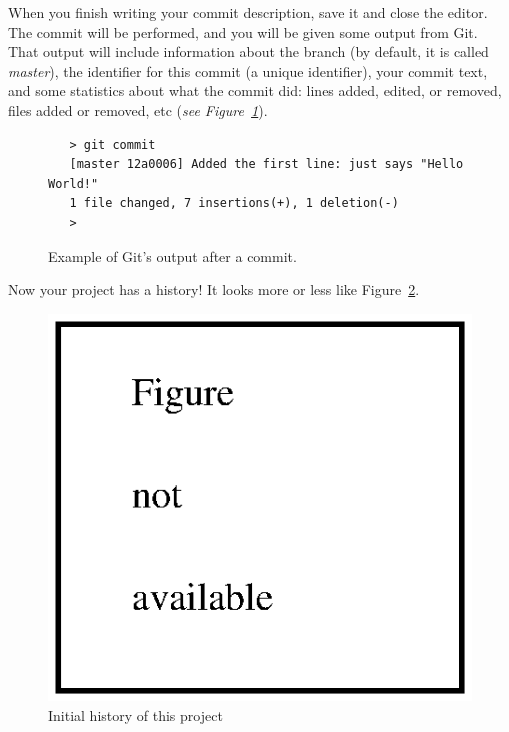 When you finish writing your commit description, save it and close the
editor. The commit will be performed, and you will be given some
output from Git. That output will include information about the
branch (by default, it is called \emph{master}), the identifier for
this commit (a unique identifier), your commit text, and some 
statistics about what the commit did: lines added, edited, or removed,
files added or removed, etc (\emph{see
  Figure~\ref{fig:git-example-1}}). 

\begin{figure}[htbp!]
  \centering
  \begin{framed}
    \begin{verbatim}
   > git commit
   [master 12a0006] Added the first line: just says "Hello World!"
   1 file changed, 7 insertions(+), 1 deletion(-)
   >
   \end{verbatim}
  \end{framed}
  \caption{Example of Git's output after a commit.}
  \label{fig:git-example-1}
\end{figure}

Now your project has a history! It looks more or less like Figure~\ref{fig:git-example-2}.

\begin{figure}[htbp!]
  \centering
  \includegraphics{gfx/no_figure.eps}
  \caption{Initial history of this project}
  \label{fig:git-example-2}
\end{figure}

